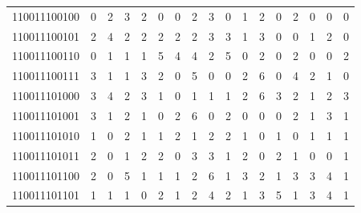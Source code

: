 \documentclass[10pt,a4paper]{article}
\begin{document}
\begin{longtable}{ |c|c|c|c|c|c|c|c|c|c|c|c|c|c|c|c|c| }
    110011100100              & 0                            & 2                                & 3                            & 2                              & 0   & 0   & 2   & 3   & 0   & 1   & 2   & 0   & 2   & 0   & 0   & 0   \\
    110011100101              & 2                            & 4                                & 2                            & 2                              & 2   & 2   & 2   & 3   & 3   & 1   & 3   & 0   & 0   & 1   & 2   & 0   \\
    110011100110              & 0                            & 1                                & 1                            & 1                              & 5   & 4   & 4   & 2   & 5   & 0   & 2   & 0   & 2   & 0   & 0   & 2   \\
    110011100111              & 3                            & 1                                & 1                            & 3                              & 2   & 0   & 5   & 0   & 0   & 2   & 6   & 0   & 4   & 2   & 1   & 0   \\
    110011101000              & 3                            & 4                                & 2                            & 3                              & 1   & 0   & 1   & 1   & 1   & 2   & 6   & 3   & 2   & 1   & 2   & 3   \\
    110011101001              & 3                            & 1                                & 2                            & 1                              & 0   & 2   & 6   & 0   & 2   & 0   & 0   & 0   & 2   & 1   & 3   & 1   \\
    110011101010              & 1                            & 0                                & 2                            & 1                              & 1   & 2   & 1   & 2   & 2   & 1   & 0   & 1   & 0   & 1   & 1   & 1   \\
    110011101011              & 2                            & 0                                & 1                            & 2                              & 2   & 0   & 3   & 3   & 1   & 2   & 0   & 2   & 1   & 0   & 0   & 1   \\
    110011101100              & 2                            & 0                                & 5                            & 1                              & 1   & 1   & 2   & 6   & 1   & 3   & 2   & 1   & 3   & 3   & 4   & 1   \\
    110011101101              & 1                            & 1                                & 1                            & 0                              & 2   & 1   & 2   & 4   & 2   & 1   & 3   & 5   & 1   & 3   & 4   & 1   \\

\end{longtable}
\end{document}
